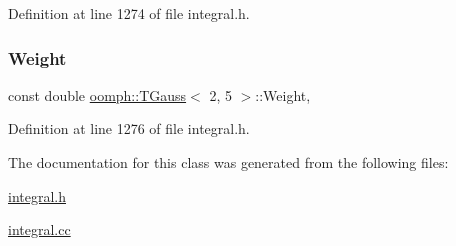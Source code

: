 Definition at line 1274 of file integral.\+h.

\mbox{\label{classoomph_1_1TGauss_3_012_00_015_01_4_a1ac3ff2579c0660ccfcaaacdc1e09189}} 
\subsubsection{\texorpdfstring{Weight}{Weight}}
{\footnotesize\ttfamily const double \hyperlink{classoomph_1_1TGauss}{oomph\+::\+T\+Gauss}$<$ 2, 5 $>$\+::Weight\hspace{0.3cm}{\ttfamily [static]}, {\ttfamily [private]}}



Definition at line 1276 of file integral.\+h.



The documentation for this class was generated from the following files\+:\begin{DoxyCompactItemize}
\item 
\hyperlink{integral_8h}{integral.\+h}\item 
\hyperlink{integral_8cc}{integral.\+cc}\end{DoxyCompactItemize}
